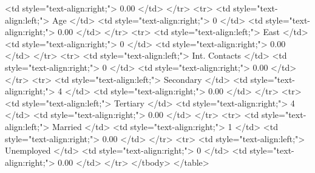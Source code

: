    <td style="text-align:right;"> 0.00 </td>
  </tr>
  <tr>
   <td style="text-align:left;"> Age </td>
   <td style="text-align:right;"> 0 </td>
   <td style="text-align:right;"> 0.00 </td>
  </tr>
  <tr>
   <td style="text-align:left;"> East </td>
   <td style="text-align:right;"> 0 </td>
   <td style="text-align:right;"> 0.00 </td>
  </tr>
  <tr>
   <td style="text-align:left;"> Int. Contacts </td>
   <td style="text-align:right;"> 0 </td>
   <td style="text-align:right;"> 0.00 </td>
  </tr>
  <tr>
   <td style="text-align:left;"> Secondary </td>
   <td style="text-align:right;"> 4 </td>
   <td style="text-align:right;"> 0.00 </td>
  </tr>
  <tr>
   <td style="text-align:left;"> Tertiary </td>
   <td style="text-align:right;"> 4 </td>
   <td style="text-align:right;"> 0.00 </td>
  </tr>
  <tr>
   <td style="text-align:left;"> Married </td>
   <td style="text-align:right;"> 1 </td>
   <td style="text-align:right;"> 0.00 </td>
  </tr>
  <tr>
   <td style="text-align:left;"> Unemployed </td>
   <td style="text-align:right;"> 0 </td>
   <td style="text-align:right;"> 0.00 </td>
  </tr>
</tbody>
</table>